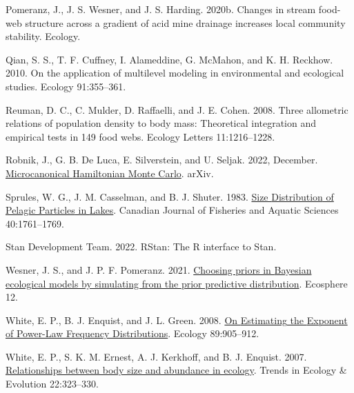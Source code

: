 \documentclass[
  12pt,
]{article}
\newlength{\cslhangindent}
\newlength{\cslentryspacingunit} %
\newenvironment{CSLReferences}[2] %
 {%
  \setlength{\parindent}{0pt}
  \ifodd #1
  \let\oldpar\par
  \def\par{\hangindent=\cslhangindent\oldpar}
  \fi
  \setlength{\parskip}{#2\cslentryspacingunit}
 }%
 {}
\begin{document}
\begin{CSLReferences}{1}{0}
\leavevmode{}%
Pomeranz, J., J. S. Wesner, and J. S. Harding. 2020b. Changes in stream
food-web structure across a gradient of acid mine drainage increases
local community stability. Ecology.

\leavevmode{}%
Qian, S. S., T. F. Cuffney, I. Alameddine, G. McMahon, and K. H.
Reckhow. 2010. On the application of multilevel modeling in
environmental and ecological studies. Ecology 91:355--361.

\leavevmode{}%
Reuman, D. C., C. Mulder, D. Raffaelli, and J. E. Cohen. 2008. Three
allometric relations of population density to body mass: Theoretical
integration and empirical tests in 149 food webs. Ecology Letters
11:1216--1228.

\leavevmode{}%
Robnik, J., G. B. De Luca, E. Silverstein, and U. Seljak. 2022,
December.
\href{https://doi.org/10.48550/arXiv.2212.08549}{Microcanonical
{Hamiltonian Monte Carlo}}. {arXiv}.

\leavevmode{}%
Sprules, W. G., J. M. Casselman, and B. J. Shuter. 1983.
\href{https://doi.org/10.1139/f83-205}{Size {Distribution} of {Pelagic
Particles} in {Lakes}}. Canadian Journal of Fisheries and Aquatic
Sciences 40:1761--1769.

\leavevmode{}%
Stan Development Team. 2022. {RStan}: The {R} interface to {Stan}.

\leavevmode{}%
Wesner, J. S., and J. P. F. Pomeranz. 2021.
\href{https://doi.org/10.1002/ecs2.3739}{Choosing priors in {Bayesian}
ecological models by simulating from the prior predictive distribution}.
Ecosphere 12.

\leavevmode{}%
White, E. P., B. J. Enquist, and J. L. Green. 2008.
\href{https://doi.org/10.1890/07-1288.1}{On {Estimating} the {Exponent}
of {Power-Law Frequency Distributions}}. Ecology 89:905--912.

\leavevmode{}%
White, E. P., S. K. M. Ernest, A. J. Kerkhoff, and B. J. Enquist. 2007.
\href{https://doi.org/10.1016/j.tree.2007.03.007}{Relationships between
body size and abundance in ecology}. Trends in Ecology \& Evolution
22:323--330.

\end{CSLReferences}
\end{document}
